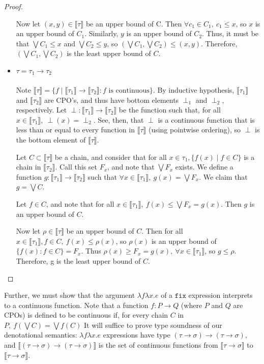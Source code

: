 \begin{proof}
\begin{itemize}
Now let $(x,y) \in \llbracket \tau \rrbracket$ be an upper bound of C. Then $\forall c_1 \in C_1, \ c_1 \leq x$, so $x$ is an upper 
bound of $C_1$. Similarly, $y$ is an upper bound of $C_2$. Thus, it must be that $\bigvee C_1 \leq x$ and 
$\bigvee C_2 \leq y$, so $(\bigvee C_1, \bigvee C_2) \leq (x,y)$. Therefore, $(\bigvee C_1, \bigvee C_2)$ is the least upper
bound of $C$.

\item $\tau = \tau_1 \rightarrow \tau_2$ \\ \\
Note $\llbracket \tau \rrbracket = \{f \mid \llbracket \tau_1 \rrbracket \rightarrow \llbracket \tau_2 \rrbracket : f \text{ is continuous}\}
$. By inductive hypothesis, $\llbracket \tau_1 \rrbracket$ and $\llbracket \tau_2 \rrbracket$ are CPO's, and thus have bottom
elements $\perp_1$ and $\perp_2$, respectively. Let $\perp: \llbracket \tau_1 \rrbracket \rightarrow \llbracket \tau_2 
\rrbracket$ be the function such that, for all $ x \in \llbracket \tau_1 \rrbracket, \ \perp(x) = \perp_2$. See, then, that 
$\perp$ is a continuous function that is less than or equal to every function in $\llbracket \tau \rrbracket$ (using pointwise
ordering), so $\perp$ is the bottom element of $\llbracket \tau \rrbracket$.  

Let $C \subset \llbracket \tau \rrbracket$ be a 
chain, and consider that for all $ x \in \tau_1, \{f(x) \mid f \in C\}$ is a chain in $\llbracket \tau_2 \rrbracket$. Call this set $F_x$,
and note that $\bigvee F_x$ exists. We define a function $g: \llbracket \tau_1 \rrbracket \rightarrow \llbracket \tau_2 \rrbracket$ 
such that $\forall x \in \llbracket \tau_1 \rrbracket, \ g(x) = \bigvee F_x$. We claim that $g = \bigvee C$. 

Let $f \in C$, and note that for all $ x \in \llbracket \tau_1 \rrbracket, \ f(x) \leq \bigvee F_x =g(x)$. Then $g$ is an upper bound of $C$.

Now let $\rho \in \llbracket \tau \rrbracket$ be an upper bound of $C$. Then for all $ x \in \llbracket \tau_1 \rrbracket, f \in C, \ f(x) \leq \rho(x)$, so $\rho(x)$ is an upper bound of $\{f(x) : f \in C\} = F_x$. Thus $\rho(x) \geq F_x = g(x), \ \forall x \in 
\llbracket \tau_1 \rrbracket$, so $g \leq \rho$. Therefore, g is the least upper bound of $C$.
\end{itemize} 
\end{proof}
%

Further, we must show that the argument $\lambda f\lambda x.e$ of a $\texttt{fix}$ expression interprets to a continuous function. Note that a function $f: P \rightarrow Q$ (where $P$ and $Q$ are CPOs) is defined to be continuous if, for every
chain $C$ in $P, \ f(\bigvee C) = \bigvee f(C)$ It will suffice to prove type
soundness of our denotational semantics: $\lambda f\lambda x.e$ expressions have type $(\tau \rightarrow \sigma) \rightarrow (\tau \rightarrow \sigma)$, and 
$\llbracket (\tau \rightarrow \sigma) \rightarrow (\tau \rightarrow \sigma) \rrbracket$ is the set of continuous functions from $\llbracket \tau \rightarrow \sigma \rrbracket$ to
$\llbracket \tau \rightarrow \sigma \rrbracket$. 

